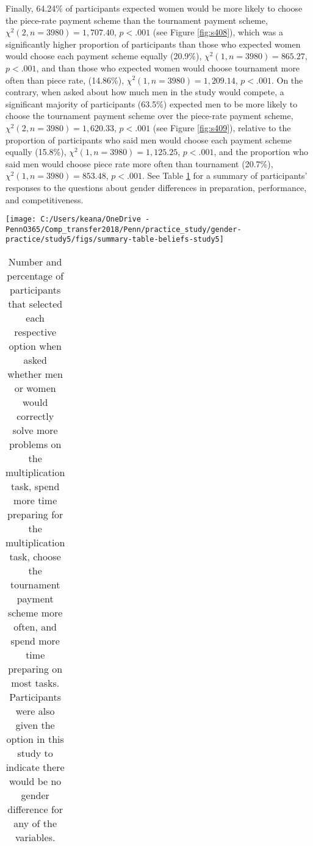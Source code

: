 \documentclass[letterpaper, nobind]{templates/ociamthesis}
\begin{document}
Finally, 64.24\% of participants expected women would be more likely to choose the piece-rate payment scheme than the tournament payment scheme, \(\chi^2(2, n = 3980) = 1,707.40\), \(p < .001\) (see Figure \ref{fig:s408}), which was a significantly higher proportion of participants than those who expected women would choose each payment scheme equally (20.9\%), \(\chi^2(1, n = 3980) = 865.27\), \(p < .001\), and than those who expected women would choose tournament more often than piece rate, (14.86\%), \(\chi^2(1, n = 3980) = 1,209.14\), \(p < .001\). On the contrary, when asked about how much men in the study would compete, a significant majority of participants (63.5\%) expected men to be more likely to choose the tournament payment scheme over the piece-rate payment scheme, \(\chi^2(2, n = 3980) = 1,620.33\), \(p < .001\) (see Figure \ref{fig:s409}), relative to the proportion of participants who said men would choose each payment scheme equally (15.8\%), \(\chi^2(1, n = 3980) = 1,125.25\), \(p < .001\), and the proportion who said men would choose piece rate more often than tournament (20.7\%), \(\chi^2(1, n = 3980) = 853.48\), \(p < .001\). See Table \ref{tab:summary-table-beliefs-study5} for a summary of participants' responses to the questions about gender differences in preparation, performance, and competitiveness.

\begin{center}\texttt{[image: C:/Users/keana/OneDrive - PennO365/Comp\_transfer2018/Penn/practice\_study/gender-practice/study5/figs/summary-table-beliefs-study5]} \end{center}

\begin{table}[ht]
\centering
\begingroup\fontsize{0.1pt}{0.1pt}\selectfont
\begin{tabular}{r}
   \\ 
 \end{tabular}
\endgroup
\caption{Number and percentage of participants that selected each respective option when asked whether men or women would correctly solve more problems on the multiplication task, spend more time preparing for the multiplication task, choose the tournament payment scheme more often, and spend more time preparing on most tasks. Participants were also given the option in this study to indicate there would be no gender difference for any of the variables.} 
\label{tab:summary-table-beliefs-study5}
\end{table}
\end{document}
